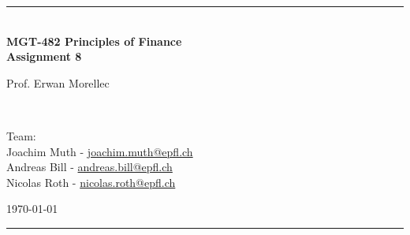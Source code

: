 \documentclass[a4paper,11pt,twoside]{article}
\newcommand{\mail}[1]{{\href{mailto:#1}{#1}}}
\begin{document}
\begin{titlepage} %
\begin{center}
\newcommand{\HRule}{\rule{\linewidth}{0.5mm}} %
\center %
 
 




\begin{figure} [h] %
\centerline{
} 
\end{figure}

\HRule \\[0.4cm]
{ \huge \bfseries MGT-482 Principles of Finance \\Assignment 8}\\[0.4cm] %

\begin{minipage}[t]{0.4\textwidth}
\flushleft
Prof. Erwan Morellec
\end{minipage}
~
\begin{minipage}[t]{0.55\textwidth}
\flushright
Team: \\
Joachim Muth - \mail{joachim.muth@epfl.ch}\\
Andreas Bill - \mail{andreas.bill@epfl.ch}\\
Nicolas Roth - \mail{nicolas.roth@epfl.ch}\\
\end{minipage}
\begin{center}
\today
\end{center}
\HRule \\

\end{center}
\end{titlepage}



\pagestyle{fancy}

\end{document}
